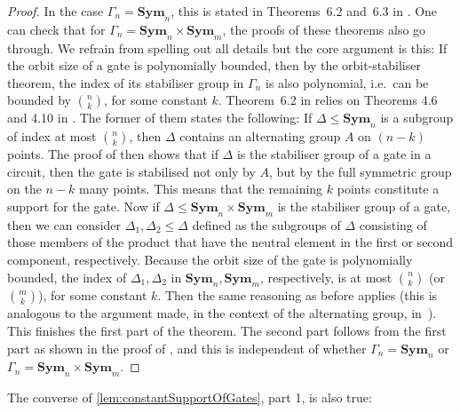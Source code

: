 \documentclass[11pt, DIV=15]{scrarticle}
\theoremstyle{definition}
\theoremstyle{plain}
\theoremstyle{remark}
\newcommand{\Sym}{\mathbf{Sym}}
\begin{document}
\begin{proof}
	In the case $\Gamma_n = \Sym_n$, this is stated in
	Theorems~6.2 and~6.3 in \cite{dawar_symmetric_2025}.
	One can check that for $\Gamma_n = \Sym_n \times \Sym_m$, the proofs of these theorems also go through. We refrain from spelling out all details but the core argument is this: 
	If the orbit size of a gate is polynomially bounded, then by the orbit-stabiliser theorem, the index of its stabiliser group in $\Gamma_n$ is also polynomial, i.e.\ can be bounded by $\binom{n}{k}$, for some constant $k$.
	Theorem~6.2 in \cite{dawar_symmetric_2025} relies on Theorems 4.6 and 4.10 in \cite{dawar_rank_logic}. The former of them states the following: If $\Delta \leq \Sym_n$ is a subgroup of index at most $\binom{n}{k}$, then $\Delta$ contains an alternating group $A$ on $(n-k)$ points. The proof of \cite[Theorem 4.10]{dawar_rank_logic} then shows that if $\Delta$ is the stabiliser group of a gate in a circuit, then the gate is stabilised not only by $A$, but by the full symmetric group on the $n-k$ many points. 
	This means that the remaining $k$ points constitute a support for the gate. Now if $\Delta \leq \Sym_n \times \Sym_m$ is the stabiliser group of a gate, then we can consider $\Delta_1, \Delta_2 \leq \Delta$ defined as the subgroups of $\Delta$ consisting of those members of the product that have the neutral element in the first or second component, respectively. 
	Because the orbit size of the gate is polynomially bounded,
	the index of $\Delta_1, \Delta_2$ in $\Sym_n, \Sym_m$,
	respectively, is at most $\binom{n}{k}$ (or $\binom{m}{k}$),
	for some constant $k$. Then the same reasoning as before
	applies (this is analogous to the argument made, in the context of
	the alternating group, in~\cite{dawar2021lower}).
	This finishes the first part of the theorem. The second part follows from the first part as shown in the proof of  \cite[Theorem~6.3]{dawar_symmetric_2025}, and this is independent of whether $\Gamma_n = \Sym_n$ or $\Gamma_n = \Sym_n \times \Sym_m$.
\end{proof}	

The converse of \cref{lem:constantSupportOfGates}, part 1, is also true:
\end{document}
